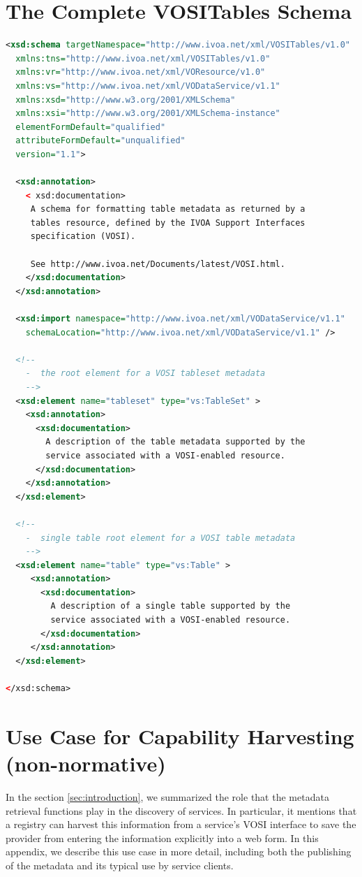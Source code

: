 \documentclass[11pt,letter]{ivoa}
\begin{document}
\section{The Complete VOSITables Schema}
\label{appendix:tables}
\begin{lstlisting}[language=XML]
<xsd:schema targetNamespace="http://www.ivoa.net/xml/VOSITables/v1.0"
  xmlns:tns="http://www.ivoa.net/xml/VOSITables/v1.0"
  xmlns:vr="http://www.ivoa.net/xml/VOResource/v1.0"
  xmlns:vs="http://www.ivoa.net/xml/VODataService/v1.1"
  xmlns:xsd="http://www.w3.org/2001/XMLSchema"
  xmlns:xsi="http://www.w3.org/2001/XMLSchema-instance"
  elementFormDefault="qualified"
  attributeFormDefault="unqualified"
  version="1.1">

  <xsd:annotation>
    < xsd:documentation>
     A schema for formatting table metadata as returned by a 
     tables resource, defined by the IVOA Support Interfaces 
     specification (VOSI). 

     See http://www.ivoa.net/Documents/latest/VOSI.html.  
    </xsd:documentation>
  </xsd:annotation>

  <xsd:import namespace="http://www.ivoa.net/xml/VODataService/v1.1"
    schemaLocation="http://www.ivoa.net/xml/VODataService/v1.1" />

  <!--
    -  the root element for a VOSI tableset metadata
    -->
  <xsd:element name="tableset" type="vs:TableSet" >
    <xsd:annotation>
      <xsd:documentation>
        A description of the table metadata supported by the 
        service associated with a VOSI-enabled resource.
      </xsd:documentation>
    </xsd:annotation>
  </xsd:element>
  
  <!--
    -  single table root element for a VOSI table metadata
    -->
  <xsd:element name="table" type="vs:Table" >
     <xsd:annotation>
       <xsd:documentation>
         A description of a single table supported by the
         service associated with a VOSI-enabled resource.
       </xsd:documentation>
     </xsd:annotation>
  </xsd:element>

</xsd:schema>
\end{lstlisting}

\section{Use Case for Capability Harvesting (non-normative)}
\label{appendix:harvesting}

 In the section \ref{sec:introduction}, we summarized the role that the metadata retrieval functions play in the discovery of services. In particular, it mentions that a registry can harvest this information from a service's VOSI interface to save the provider from entering the information explicitly into a web form. In this appendix, we describe this use case in more detail, including both the publishing of the metadata and its typical use by service clients.
\end{document}
